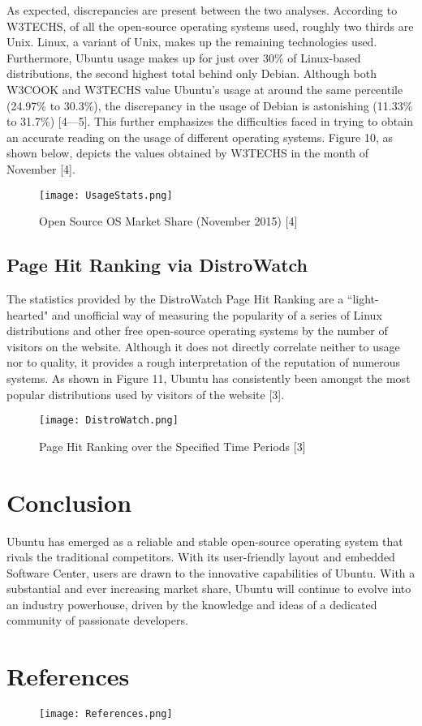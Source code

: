 \documentclass[11pt]{article}
\newcommand{\forceindent}{\leavevmode{\parindent=1em\indent}}
\begin{document}
As expected, discrepancies are present between the two analyses. According to W3TECHS, of all the open-source operating systems used, roughly two thirds are Unix. Linux, a variant of Unix, makes up the remaining technologies used. Furthermore, Ubuntu usage makes up for just over 30\% of Linux-based distributions, the second highest total behind only Debian. Although both W3COOK and W3TECHS value Ubuntu's usage at around the same percentile (24.97\% to 30.3\%), the discrepancy in the usage of Debian is astonishing (11.33\% to 31.7\%) [4---5]. This further emphasizes the difficulties faced in trying to obtain an accurate reading on the usage of different operating systems. Figure 10, as shown below, depicts the values obtained by W3TECHS in the month of November [4].\\ 

\begin{figure}[h!]
  \centering
    \caption{Open Source OS Market Share (November 2015) [4]}
{\texttt{[image: UsageStats.png]}}
\end{figure}    

\subsection{Page Hit Ranking via DistroWatch}

\forceindent The statistics provided by the DistroWatch Page Hit Ranking are a ``light-hearted" and unofficial way of measuring the popularity of a series of Linux distributions and other free open-source operating systems by the number of visitors on the website. Although it does not directly correlate neither to usage nor to quality, it provides a rough interpretation of the reputation of numerous systems. As shown in Figure 11, Ubuntu has consistently been amongst the most popular distributions used by visitors of the website [3]. \\
 
\begin{figure}[h!]
  \centering
    \caption{Page Hit Ranking over the Specified Time Periods [3]}
{\texttt{[image: DistroWatch.png]}}
\end{figure} 

\section{Conclusion}
\forceindent Ubuntu has emerged as a reliable and stable open-source operating system that rivals the traditional competitors. With its user-friendly layout and embedded Software Center, users are drawn to the innovative capabilities of Ubuntu. With a substantial and ever increasing market share, Ubuntu will continue to evolve into an industry powerhouse, driven by the knowledge and ideas of a dedicated community of passionate developers.  
 
\newpage 
\section{References}
\vspace{0.2cm}
\begingroup
\renewcommand{\section}[2]{}%
\nocite{*}
\begin{figure}[h!]
  \centering
{\texttt{[image: References.png]}}
\end{figure}
\endgroup
\end{document}
